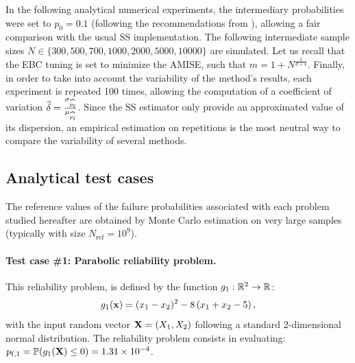 In the following analytical numerical experiments, the intermediary probabilities were set to $p_0=0.1$ (following the recommendations from \citealp{AuBeck2001}), allowing a fair comparison with the usual SS implementation. 
The following intermediate sample sizes $N \in \{300, 500, 700, 1000, 2000, 5000, 10000\}$ are simulated.
Let us recall that the EBC tuning is set to minimize the AMISE, such that $m = 1 + N^{\frac{2}{d+4}}$. 
Finally, in order to take into account the variability of the method's results, each experiment is repeated 100 times, allowing the computation of a coefficient of variation $\widehat{\delta} = \frac{\sigma_{\widehat{p_\mathrm{f}}}}{\mu_{\widehat{p_\mathrm{f}}}}$. 
Since the SS estimator only provide an approximated value of its dispersion, an empirical estimation on repetitions is the most neutral way to compare the variability of several methods. 


\subsection{Analytical test cases}\label{sec:testcases}
The reference values of the failure probabilities associated with each problem studied hereafter are obtained by Monte Carlo estimation on very large samples (typically with size $N_{\mathrm{ref}} = 10^9$). 

\paragraph{Test case \#1: Parabolic reliability problem.}
This reliability problem, is defined by the function $g_1: \mathbb{R}^2 \rightarrow \mathbb{R}$:
\begin{equation}
    g_1({\bf x})= (x_1 - x_2) ^ 2 - 8 \, (x_1 + x_2 - 5)\, ,
\end{equation}
with the input random vector ${\bf X} = (X_1, X_2)$ following a standard 2-dimensional normal distribution. 
The reliability problem consists in evaluating: $p_{\mathrm{f}, 1} = \mathbb{P} ( g_1({\bf X}) \leq 0 ) = 1.31 \times 10^{-4}$.

